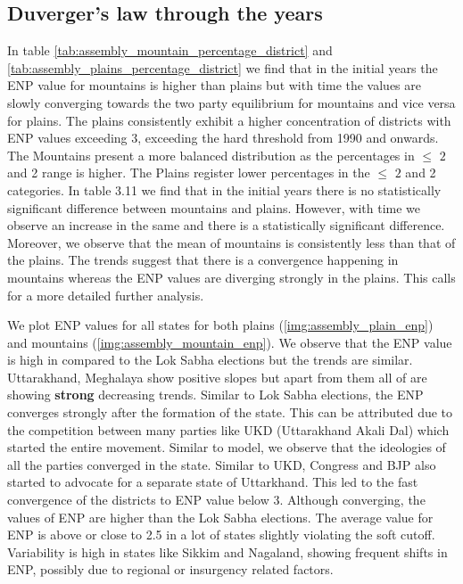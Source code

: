\subsection{Duverger’s law through the years}
In table \ref{tab:assembly_mountain_percentage_district} and \ref{tab:assembly_plains_percentage_district} we find that in the initial years the ENP value for mountains is higher than plains but with time the values are slowly converging towards the two party equilibrium for mountains and vice versa for plains. The plains consistently exhibit a higher concentration of districts with ENP values exceeding $3$, exceeding the hard threshold from 1990 and onwards.  The Mountains present a more balanced distribution as the percentages in $\leq$ $2$ and 2  range is higher.  The Plains  register lower percentages in the $\leq$ $2$ and 2  categories.   In table 3.11 we find that in the initial years there is no statistically significant difference between mountains and plains. However, with time we observe an increase in the same and there is a statistically significant difference. Moreover, we observe that the mean of mountains is consistently less than that of the plains. The trends suggest that there is a convergence happening in mountains whereas the ENP values are diverging strongly in the plains. This calls for a more detailed further analysis.

 We plot ENP values for all states for both plains (\ref{img:assembly_plain_enp}) and mountains (\ref{img:assembly_mountain_enp}). We observe that the ENP value is high in compared to the Lok Sabha elections but the trends are similar. Uttarakhand, Meghalaya show positive slopes but apart from them all of are showing \textbf{strong} decreasing trends. Similar to Lok Sabha elections, the ENP converges strongly after the formation of the state. This can be attributed due to the competition between many parties like UKD (Uttarakhand Akali Dal) which started the entire movement. Similar to \cite{fey2007duverger} model, we observe that the ideologies of all the parties converged in the state. Similar to UKD, Congress and BJP also started to advocate for a separate state of Uttarkhand. This led to the fast convergence of the districts to ENP value below 3. Although converging, the values of ENP are higher than the Lok Sabha elections. The average value for ENP is above or close to 2.5 in a lot of states slightly violating the soft cutoff. Variability is high in states like Sikkim and Nagaland, showing frequent shifts in ENP, possibly due to regional or insurgency related factors. 
 

